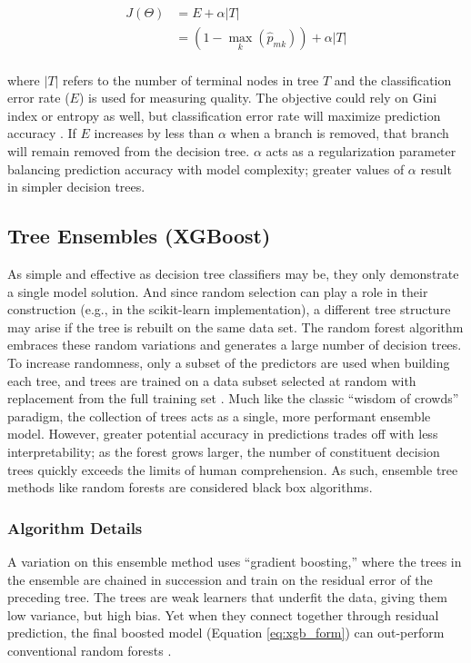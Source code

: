 \begin{equation}
\label{dtree_objective}
\begin{aligned}
    J(\Theta) &= E + \alpha\left|T\right| \\
    &= \left(1 - \max_k(\hat{p}_{mk})\right)+\alpha\left|T\right|
\end{aligned}
\end{equation}
\\
where $\left|T\right|$ refers to the number of terminal nodes in tree $T$ and the classification error rate ($E$) is used for measuring quality. The objective could rely on Gini index or entropy as well, but classification error rate will maximize prediction accuracy \citep[p.\ 312]{james_introduction_2013}. If $E$ increases by less than $\alpha$ when a branch is removed, that branch will remain removed from the decision tree. $\alpha$ acts as a regularization parameter balancing prediction accuracy with model complexity; greater values of $\alpha$ result in simpler decision trees.

\subsection{Tree Ensembles (XGBoost)}\label{ch3:tree_ensembles}
As simple and effective as decision tree classifiers may be, they only demonstrate a single model solution. And since random selection can play a role in their construction (e.g., in the scikit-learn implementation), a different tree structure may arise if the tree is rebuilt on the same data set. The random forest algorithm embraces these random variations and generates a large number of decision trees. To increase randomness, only a subset of the predictors are used when building each tree, and trees are trained on a data subset selected at random with replacement from the full training set \citep[p. 376--377]{bertsimas_analytics_2016}. Much like the classic ``wisdom of crowds'' paradigm, the collection of trees acts as a single, more performant ensemble model. However, greater potential accuracy in predictions trades off with less interpretability; as the forest grows larger, the number of constituent decision trees quickly exceeds the limits of human comprehension. As such, ensemble tree methods like random forests are considered black box algorithms.

\subsubsection{Algorithm Details}\label{ch3:xgb_details}
A variation on this ensemble method uses ``gradient boosting,'' where the trees in the ensemble are chained in succession and train on the residual error of the preceding tree. The trees are weak learners that underfit the data, giving them low variance, but high bias. Yet when they connect together through residual prediction, the final boosted model (Equation \ref{eq:xgb_form}) can out-perform conventional random forests \citep[p. 323]{james_introduction_2013}.

